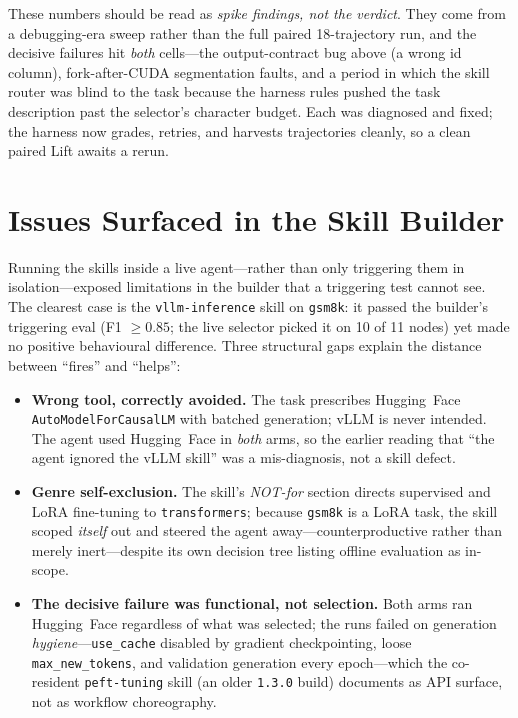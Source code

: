 \documentclass[11pt,a4paper]{article}
\begin{document}
These numbers should be read as \emph{spike findings, not the verdict}. They come from a
debugging-era sweep rather than the full paired 18-trajectory run, and the decisive failures
hit \emph{both} cells---the output-contract bug above (a wrong id column), fork-after-CUDA
segmentation faults, and a period in which the skill router was blind to the task because the
harness rules pushed the task description past the selector's character budget. Each was
diagnosed and fixed; the harness now grades, retries, and harvests trajectories cleanly, so a
clean paired Lift awaits a rerun.

\section{Issues Surfaced in the Skill Builder}

Running the skills inside a live agent---rather than only triggering them in isolation---exposed
limitations in the builder that a triggering test cannot see. The clearest case is the
\texttt{vllm-inference} skill on \texttt{gsm8k}: it passed the builder's triggering eval
(F1 $\geq 0.85$; the live selector picked it on 10 of 11 nodes) yet made no positive
behavioural difference. Three structural gaps explain the distance between ``fires'' and
``helps'':
\begin{itemize}
\item \textbf{Wrong tool, correctly avoided.} The task prescribes Hugging~Face
\texttt{AutoModelForCausalLM} with batched generation; vLLM is never intended. The agent used
Hugging~Face in \emph{both} arms, so the earlier reading that ``the agent ignored the vLLM
skill'' was a mis-diagnosis, not a skill defect.
\item \textbf{Genre self-exclusion.} The skill's \emph{NOT-for} section directs supervised and
LoRA fine-tuning to \texttt{transformers}; because \texttt{gsm8k} is a LoRA task, the skill
scoped \emph{itself} out and steered the agent away---counterproductive rather than merely
inert---despite its own decision tree listing offline evaluation as in-scope.
\item \textbf{The decisive failure was functional, not selection.} Both arms ran Hugging~Face
regardless of what was selected; the runs failed on generation \emph{hygiene}---\texttt{use\_cache}
disabled by gradient checkpointing, loose \texttt{max\_new\_tokens}, and validation generation
every epoch---which the co-resident \texttt{peft-tuning} skill (an older \texttt{1.3.0} build)
documents as API surface, not as workflow choreography.
\end{itemize}
\end{document}
